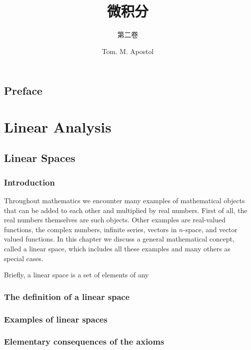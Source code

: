 \documentclass[cn,11pt,chinese]{elegantbook}
\title{微积分}
\subtitle{第二卷}
\author{Tom. M. Apostol}
\numberwithin{equation}{section}
\begin{document}
\maketitle

\chapter*{Preface}


\tableofcontents
\mainmatter
\hypersetup{pageanchor=true}


\part{Linear Analysis}
\chapter{Linear Spaces}
\section{Introduction}
Throughout mathematics we encounter many examples of mathematical objects that can be added to each other and multiplied by real numbers. First of all, the real numbers themselves are such objects. Other examples are real-valued functions, the complex numbers, infinite series, vectors in $n$-space, and vector valued functions. In this chapter we discuss a general mathematical concept, called a linear space, which includes all these examples and many others as special cases.

Briefly, a linear space is a set of elements of any 


\section{The definition of a linear space}



\section{Examples of linear spaces}



\section{Elementary consequences of the axioms}
\end{document}
